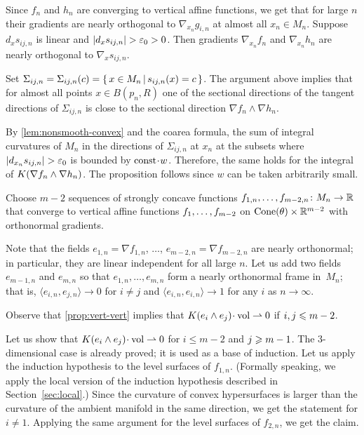 Since $f_n$ and $h_n$ are converging to vertical affine functions, we get that for large $n$ their gradients are nearly orthogonal to $\nabla_{x_n} g_{i,n}$ at almost all $x_n\in M_n$.
Suppose $d_xs_{ij,n}$ is linear and $|d_xs_{ij,n}|>\eps_0>0$.
Then gradients $\nabla_{x_n}f_n$ and $\nabla_{x_n}h_n$ are nearly orthogonal to $\nabla_x s_{ij,n}$.

Set $\Sigma_{ij,n}=\Sigma_{ij,n}(c)=\left\{\,x\in M_n\,\middle|\,s_{ij,n}(x)=c\,\right\}$.
The argument above implies that for almost all points $x\in B(p_n,R)$ one of the sectional directions of the tangent directions of $\Sigma_{ij,n}$ is close to the sectional direction $\nabla f_n\wedge\nabla h_n$.

By \ref{lem:nonsmooth-convex} and the coarea formula, the sum of integral curvatures of $M_n$ in the directions of $\Sigma_{ij,n}$ at $x_n$ at the subsets where $|d_{x_n}s_{ij,n}|>\eps_0$ is bounded by $\const\cdot w$.
Therefore, the same holds for the integral of $K(\nabla f_n\zz\wedge\nabla h_n)$.
The proposition follows since $w$ can be taken arbitrarily small.
\qeds


Choose $m-2$ sequences of strongly concave functions $f_{1,n},\zz\dots, f_{m-2,n}\: M_n\to \RR$ that converge to vertical affine functions $f_1,\zz\dots,f_{m-2}$ on  $\operatorname{Cone}(\theta)\times \mathbb{R}^{m-2}$ with orthonormal gradients.

Note that the fields $e_{1,n}=\nabla f_{1,n}$, $\dots$, $e_{m-2,n}=\nabla f_{m-2,n}$ are nearly orthonormal;
in particular, they are linear independent for all large $n$.
Let us add two fields $e_{m-1,n}$ and $e_{m,n}$  so that $e_{1,n},\dots, e_{m,n}$ form a nearly orthonormal frame in~$M_n$;
that is, $\langle e_{i,n}, e_{j,n}\rangle\to 0$ for $i\ne j$ and $\langle e_{i,n}, e_{i,n}\rangle\to 1$ for any $i$ as $n\to\infty$.

Observe that \ref{prop:vert-vert} implies that $K(e_i\wedge e_j)\cdot\vol\rightharpoonup 0$ if $i,j\zz\le m-2$.

Let us show that $K(e_i\wedge e_j)\cdot\vol\rightharpoonup 0$ for $i\le m-2$ and $j\zz\ge m\zz-1$.
The $3$-dimensional case is already proved; it is used as a base of induction.
Let us apply the induction hypothesis to the level surfaces of $f_{1,n}$.
(Formally speaking, we apply the local version of the induction hypothesis described in Section~\ref{sec:local}.)
Since the curvature of convex hypersurfaces is larger than the curvature of the ambient manifold in the same direction, we get the statement for $i\ne 1$.
Applying the same argument for the level surfaces of $f_{2,n}$, we get the claim.

